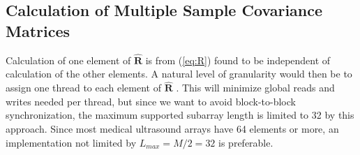 \documentclass[journal]{IEEEtran}
\newcommand{\mat}[1]{\mathbf{#1}}
\newcommand{\R}{$\mat{\hat{R}}$ }
\begin{document}


\subsection{Calculation of Multiple Sample Covariance Matrices}\label{sec:calcR}


Calculation of one element of \R is from (\ref{eq:R}) found to be independent of calculation of the other elements. A natural level of granularity would then be to assign one thread to each element of $\mat{\hat{R}}$ \cite{Chen2011}. This will minimize global reads and writes needed per thread, but since we want to avoid block-to-block synchronization, the maximum supported subarray length is limited to 32 by this approach. Since most medical ultrasound arrays have 64 elements or more, an implementation not limited by $L_{max}=M/2=32$ is preferable.
\end{document}
